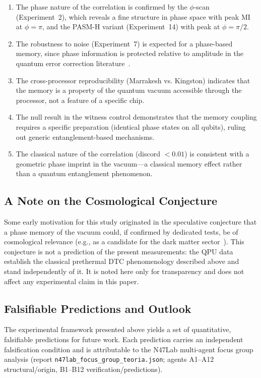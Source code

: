\documentclass[12pt,a4paper]{article}
\begin{document}
\begin{enumerate}
    \item The phase nature of the correlation is confirmed by the $\phi$-scan (Experiment~2), which reveals a fine structure in phase space with peak MI at $\phi = \pi$, and the PASM-H variant (Experiment~14) with peak at $\phi = \pi/2$.
    \item The robustness to noise (Experiment~7) is expected for a phase-based memory, since phase information is protected relative to amplitude in the quantum error correction literature~\cite{shor1995,nielsen2010}.
    \item The cross-processor reproducibility (Marrakesh vs. Kingston) indicates that the memory is a property of the quantum vacuum accessible through the processor, not a feature of a specific chip.
    \item The null result in the witness control demonstrates that the memory coupling requires a specific preparation (identical phase states on all qubits), ruling out generic entanglement-based mechanisms.
    \item The classical nature of the correlation (discord $< 0.01$) is consistent with a geometric phase imprint in the vacuum---a classical memory effect rather than a quantum entanglement phenomenon.
\end{enumerate}

\subsection{A Note on the Cosmological Conjecture}

Some early motivation for this study originated in the speculative conjecture that a phase memory of the vacuum could, if confirmed by dedicated tests, be of cosmological relevance (e.g., as a candidate for the dark matter sector~\cite{planck2018,wheeler1957,penrose1996}). This conjecture is not a prediction of the present measurements: the QPU data establish the classical prethermal DTC phenomenology described above and stand independently of it. It is noted here only for transparency and does not affect any experimental claim in this paper.

\subsection{Falsifiable Predictions and Outlook}

The experimental framework presented above yields a set of quantitative, falsifiable predictions for future work. Each prediction carries an independent falsification condition and is attributable to the N47Lab multi-agent focus group analysis (report \texttt{n47lab\_focus\_group\_teoria.json}; agents A1--A12 structural/origin, B1--B12 verification/predictions).
\end{document}
